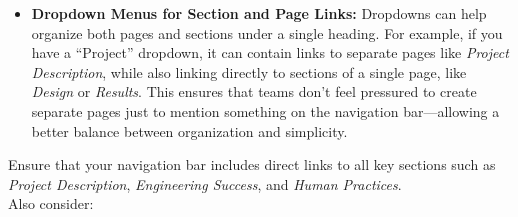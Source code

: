 \begin{itemize}
    \item \textbf{Dropdown Menus for Section and Page Links:}
    Dropdowns can help organize both pages and sections under a single heading.
    For example, if you have a ``Project'' dropdown, it can contain links to separate pages like \textit{Project Description}, while also linking directly to sections of a single page, like \textit{Design} or \textit{Results}.
    This ensures that teams don’t feel pressured to create separate pages just to mention something on the navigation bar—allowing a better balance between organization and simplicity.

\end{itemize}
Ensure that your navigation bar includes direct links to all key sections such as \textit{Project Description}, \textit{Engineering Success}, and \textit{Human Practices}. \\ \newline
Also consider:
